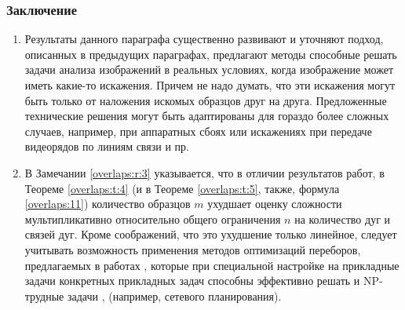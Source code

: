 \subsubsection{Заключение}
\begin{enumerate}
\item Результаты данного параграфа существенно развивают и уточняют подход, описанных в предыдущих параграфах,  предлагают методы способные решать задачи анализа изображений в реальных условиях, когда  изображение может иметь  какие-то искажения. Причем не надо думать, что эти искажения могут быть только от наложения искомых образцов друг на друга. Предложенные технические решения могут быть адаптированы для гораздо более сложных случаев, например, при аппаратных сбоях или искажениях при передаче видеорядов по линиям связи и пр.
\item В Замечании  \ref{overlaps:r:3}  указывается, что в отличии результатов работ\cite{D8,D19,scaleline}, в Теореме \ref{overlaps:t:4} (и в Теореме \ref{overlaps:t:5}, также, формула \ref{overlaps:11}) количество образцов  $m$  ухудшает оценку сложности мультипликативно относительно общего ограничения  $n$  на количество дуг и связей дуг. Кроме соображений, что это ухудшение только линейное, следует учитывать возможность применения методов оптимизаций переборов, предлагаемых в работах \cite{Hentenrick,D15}, которые при специальной настройке на прикладные задачи конкретных прикладных задач способны эффективно решать и  NP-трудные задачи \cite{D11, D2},  (например, сетевого планирования). 
\end{enumerate}
 